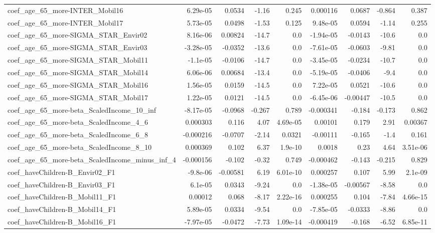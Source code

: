 \begin{tabular}{lrrrrrrrr}
coef_age_65_more-INTER_Mobil16 & 6.29e-05 & 0.0534 & -1.16 & 0.245 & 0.000116 & 0.0687 & -0.864 & 0.387 \\
coef_age_65_more-INTER_Mobil17 & 5.73e-05 & 0.0498 & -1.53 & 0.125 & 9.48e-05 & 0.0594 & -1.14 & 0.255 \\
coef_age_65_more-SIGMA_STAR_Envir02 & 8.16e-06 & 0.00824 & -14.7 & 0.0 & -1.94e-05 & -0.0143 & -10.6 & 0.0 \\
coef_age_65_more-SIGMA_STAR_Envir03 & -3.28e-05 & -0.0352 & -13.6 & 0.0 & -7.61e-05 & -0.0603 & -9.81 & 0.0 \\
coef_age_65_more-SIGMA_STAR_Mobil11 & -1.1e-05 & -0.0106 & -14.7 & 0.0 & -3.45e-05 & -0.0234 & -10.7 & 0.0 \\
coef_age_65_more-SIGMA_STAR_Mobil14 & 6.06e-06 & 0.00684 & -13.4 & 0.0 & -5.19e-05 & -0.0406 & -9.4 & 0.0 \\
coef_age_65_more-SIGMA_STAR_Mobil16 & 1.56e-05 & 0.0159 & -14.5 & 0.0 & 7.22e-05 & 0.0521 & -10.6 & 0.0 \\
coef_age_65_more-SIGMA_STAR_Mobil17 & 1.22e-05 & 0.0121 & -14.5 & 0.0 & -6.45e-06 & -0.00447 & -10.5 & 0.0 \\
coef_age_65_more-beta_ScaledIncome_10_inf & -8.17e-05 & -0.0968 & -0.267 & 0.789 & -0.000341 & -0.184 & -0.173 & 0.862 \\
coef_age_65_more-beta_ScaledIncome_4_6 & 0.000303 & 0.116 & 4.07 & 4.69e-05 & 0.00101 & 0.179 & 2.91 & 0.00367 \\
coef_age_65_more-beta_ScaledIncome_6_8 & -0.000216 & -0.0707 & -2.14 & 0.0321 & -0.00111 & -0.165 & -1.4 & 0.161 \\
coef_age_65_more-beta_ScaledIncome_8_10 & 0.000369 & 0.102 & 6.37 & 1.9e-10 & 0.0018 & 0.23 & 4.64 & 3.51e-06 \\
coef_age_65_more-beta_ScaledIncome_minus_inf_4 & -0.000156 & -0.102 & -0.32 & 0.749 & -0.000462 & -0.143 & -0.215 & 0.829 \\
coef_haveChildren-B_Envir02_F1 & -9.8e-06 & -0.00581 & 6.19 & 6.01e-10 & 0.000257 & 0.107 & 5.99 & 2.1e-09 \\
coef_haveChildren-B_Envir03_F1 & 6.1e-05 & 0.0343 & -9.24 & 0.0 & -1.38e-05 & -0.00567 & -8.58 & 0.0 \\
coef_haveChildren-B_Mobil11_F1 & 0.00012 & 0.068 & -8.17 & 2.22e-16 & 0.000255 & 0.104 & -7.84 & 4.66e-15 \\
coef_haveChildren-B_Mobil14_F1 & 5.89e-05 & 0.0334 & -9.54 & 0.0 & -7.85e-05 & -0.0333 & -8.86 & 0.0 \\
coef_haveChildren-B_Mobil16_F1 & -7.97e-05 & -0.0472 & -7.73 & 1.09e-14 & -0.000419 & -0.168 & -6.52 & 6.85e-11 \\

\end{tabular}
